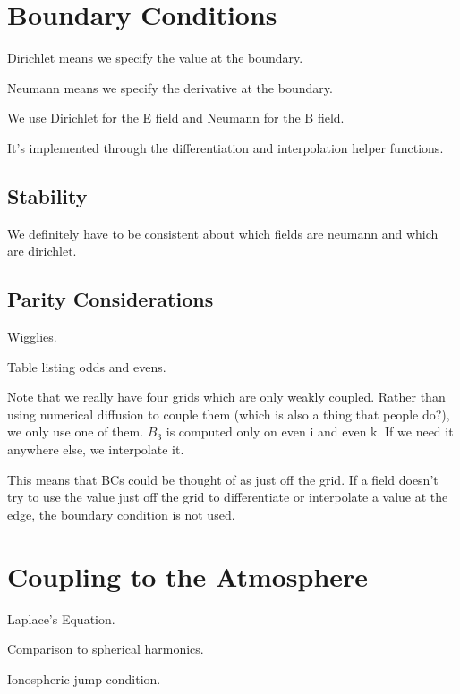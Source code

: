 \section{Boundary Conditions}

Dirichlet means we specify the value at the boundary. 

Neumann means we specify the derivative at the boundary. 

We use Dirichlet for the E field and Neumann for the B field. 

It's implemented through the differentiation and interpolation helper
functions. 

\subsection{Stability}

We definitely have to be consistent about which fields are neumann and which are
dirichlet. 

\subsection{Parity Considerations}

Wigglies. 

Table listing odds and evens. 

Note that we really have four grids which are only weakly coupled. Rather than
using numerical diffusion to couple them (which is also a thing that people
do?), we only use one of them. $B_3$ is computed only on even i and even k. If
we need it anywhere else, we interpolate it. 

This means that BCs could be thought of as just off the grid. If a field doesn't
try to use the value just off the grid to differentiate or interpolate a value
at the edge, the boundary condition is not used. 

\section{Coupling to the Atmosphere}

Laplace's Equation. 

Comparison to spherical harmonics. 

Ionospheric jump condition. 

